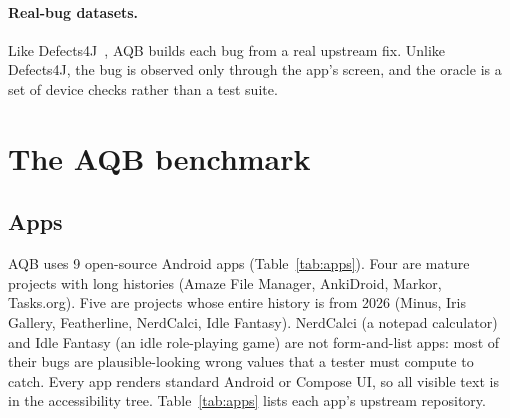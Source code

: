 \documentclass[11pt]{article}
\newcommand{\aqb}{\textsc{AQB}}
\begin{document}
\paragraph{Real-bug datasets.}
Like Defects4J~\cite{just2014defects4j}, \aqb{} builds each bug from a real upstream fix. Unlike
Defects4J, the bug is observed only through the app's screen, and the oracle is a set of device
checks rather than a test suite.

\section{The \aqb{} benchmark}\label{sec:bench}

\subsection{Apps}
\aqb{} uses 9 open-source Android apps (Table~\ref{tab:apps}). Four are mature projects with long
histories (Amaze File Manager, AnkiDroid, Markor, Tasks.org). Five are projects whose entire
history is from 2026 (Minus, Iris Gallery, Featherline, NerdCalci, Idle Fantasy). NerdCalci (a
notepad calculator) and Idle Fantasy (an idle role-playing game) are not form-and-list apps: most
of their bugs are plausible-looking wrong values that a tester must compute to catch. Every app
renders standard Android or Compose UI, so all visible text is in the accessibility tree.
Table~\ref{tab:apps} lists each app's upstream repository.

\begin{table}[!htbp]
\centering\small
\caption{Apps and the regressions planted in their episodes.}
\label{tab:apps}
\end{table}
\end{document}
